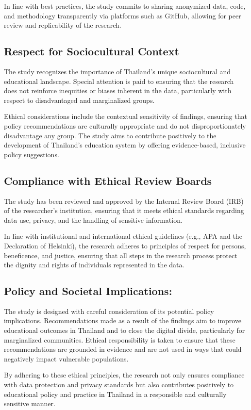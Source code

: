 \documentclass[
]{article}
\begin{document}
In line with best practices, the study commits to sharing anonymized
data, code, and methodology transparently via platforms such as GitHub,
allowing for peer review and replicability of the research.

\hypertarget{respect-for-sociocultural-context}{%
\subsection{Respect for Sociocultural
Context}\label{respect-for-sociocultural-context}}

The study recognizes the importance of Thailand's unique sociocultural
and educational landscape. Special attention is paid to ensuring that
the research does not reinforce inequities or biases inherent in the
data, particularly with respect to disadvantaged and marginalized
groups.

Ethical considerations include the contextual sensitivity of findings,
ensuring that policy recommendations are culturally appropriate and do
not disproportionately disadvantage any group. The study aims to
contribute positively to the development of Thailand's education system
by offering evidence-based, inclusive policy suggestions.

\hypertarget{compliance-with-ethical-review-boards}{%
\subsection{Compliance with Ethical Review
Boards}\label{compliance-with-ethical-review-boards}}

The study has been reviewed and approved by the Internal Review Board
(IRB) of the researcher's institution, ensuring that it meets ethical
standards regarding data use, privacy, and the handling of sensitive
information.

In line with institutional and international ethical guidelines (e.g.,
APA and the Declaration of Helsinki), the research adheres to principles
of respect for persons, beneficence, and justice, ensuring that all
steps in the research process protect the dignity and rights of
individuals represented in the data.

\hypertarget{policy-and-societal-implications}{%
\subsection{Policy and Societal
Implications:}\label{policy-and-societal-implications}}

The study is designed with careful consideration of its potential policy
implications. Recommendations made as a result of the findings aim to
improve educational outcomes in Thailand and to close the digital
divide, particularly for marginalized communities. Ethical
responsibility is taken to ensure that these recommendations are
grounded in evidence and are not used in ways that could negatively
impact vulnerable populations.

By adhering to these ethical principles, the research not only ensures
compliance with data protection and privacy standards but also
contributes positively to educational policy and practice in Thailand in
a responsible and culturally sensitive manner.
\end{document}
